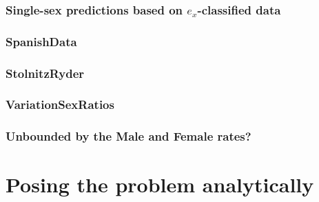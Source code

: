 \subsection{Single-sex predictions based on $e_x$-classified data}


\subsection{SpanishData}
 

\subsection{StolnitzRyder}
 

\subsection{VariationSexRatios}
 

\subsection{Unbounded by the Male and Female rates?}
 
  

 
 
 \chapter{Posing the problem analytically}
 \label{chap:Posing}
 
\startappendices


 \label{app:Appendix1}
 
 
 \nocite{*} %
\startbibliography
 \begin{singlespace} %
 \end{singlespace}


